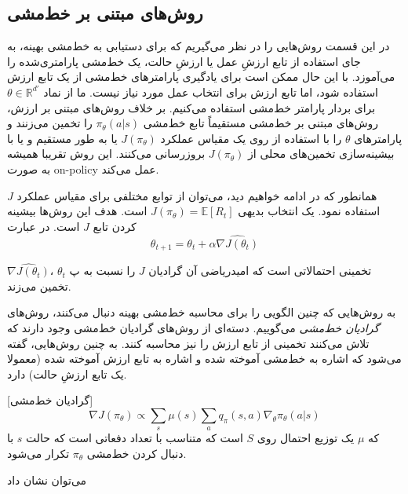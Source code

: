 
\subsection{روش‌های مبتنی بر خط‌مشی}


در این قسمت روش‌هایی را در نظر می‌گیریم که برای دستیابی به خط‌مشی بهینه، به جای استفاده از تابع ارزشِ عمل یا ارزشِ حالت، یک خط‌مشی پارامتری‌شده 
 را می‌آموزد. با این حال ممکن است برای یادگیری پارامترهای خط‌مشی از یک تابع ارزش استفاده شود، اما تابع ارزش برای انتخاب عمل مورد نیاز نیست. ما از نماد
$\theta \in \mathbb{R}^{d'}$ برای بردار پارامتر خط‌مشی استفاده می‌کنیم.
بر خلاف روش‌های مبتنی بر ارزش، روش‌های مبتنی بر خط‌مشی مستقیماً تابع خط‌مشی 
$\pi_\theta(a|s)$
 را تخمین می‌زنند و پارامترهای $\theta$ را با استفاده از 
  روی یک مقیاس عملکرد  
 $J(\pi_\theta)$ یا به طور مستقیم و یا با بیشینه‌سازی تخمین‌های محلی از  $J(\pi_\theta)$ بروزرسانی می‌کنند.
  این روش تقریبا همیشه به صورت on-policy  عمل می‌کند. 

همانطور که در ادامه خواهیم دید، می‌توان از توابع مختلفی برای مقیاس عملکرد $J$ استفاده نمود. یک انتخاب بدیهی 
$J(\pi_\theta) = \mathbb{E}[R_t]$
است. هدف این روش‌ها بیشینه کردن تابع $J$ است. در عبارت 
$$\theta_{t+1}=\theta_t + \alpha \hat{\nabla J(\theta_t)}$$
 
$\hat{\nabla J(\theta_t)}$،
تخمینی احتمالاتی است که امیدریاضی آن گرادیان  $J$ را نسبت به پ $\theta_t$ تخمین می‌زند.

به روش‌هایی که چنین الگویی را برای محاسبه خط‌مشی بهینه دنبال می‌کنند، روش‌های \textit{گرادیان خط‌مشی } می‌گوییم. دسته‌ای از روش‌های گرادیان خط‌مشی وجود دارند که تلاش می‌کنند تخمینی از تابع ارزش را نیز محاسبه کنند. به چنین روش‌هایی، \textit{} 
 گفته می‌شود که \textit{} 
  اشاره به خط‌مشی آموخته شده و \textit{} 
   اشاره به تابع ارزش آموخته شده (معمولا یک تابع ارزشِ حالت) دارد.

[گرادیان خط‌مشی]
$$\nabla J(\pi_\theta) \propto \sum_{s} \mu(s) \sum_{a} q_\pi(s,a) \nabla_\theta \pi_\theta(a|s)$$
که $\mu$ یک توزیع احتمال روی $S$ است که متناسب با تعداد دفعاتی است که حالت $s$ با دنبال کردن خط‌مشی 
$\pi_\theta$
 تکرار می‌شود.


می‌توان نشان داد 



